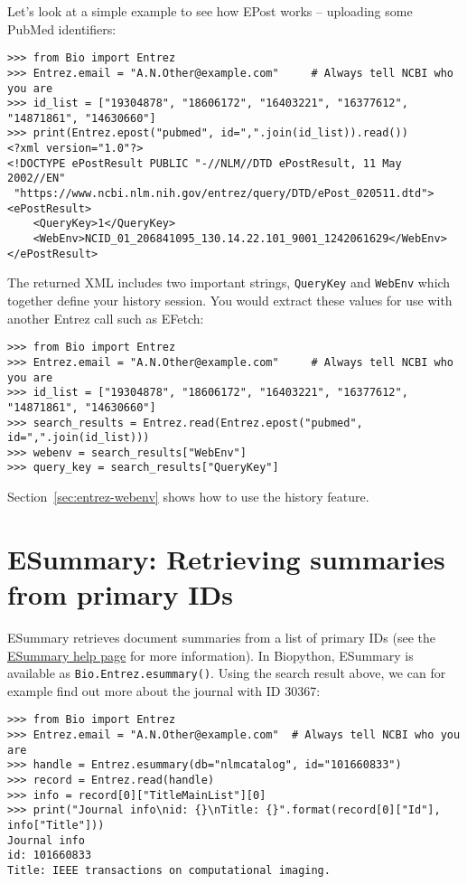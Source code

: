 Let's look at a simple example to see how EPost works -- uploading some PubMed identifiers:
\begin{verbatim}
>>> from Bio import Entrez
>>> Entrez.email = "A.N.Other@example.com"     # Always tell NCBI who you are
>>> id_list = ["19304878", "18606172", "16403221", "16377612", "14871861", "14630660"]
>>> print(Entrez.epost("pubmed", id=",".join(id_list)).read())
<?xml version="1.0"?>
<!DOCTYPE ePostResult PUBLIC "-//NLM//DTD ePostResult, 11 May 2002//EN"
 "https://www.ncbi.nlm.nih.gov/entrez/query/DTD/ePost_020511.dtd">
<ePostResult>
	<QueryKey>1</QueryKey>
	<WebEnv>NCID_01_206841095_130.14.22.101_9001_1242061629</WebEnv>
</ePostResult>
\end{verbatim}
\noindent The returned XML includes two important strings, \verb|QueryKey| and \verb|WebEnv| which together define your history session.
You would extract these values for use with another Entrez call such as EFetch:

\begin{verbatim}
>>> from Bio import Entrez
>>> Entrez.email = "A.N.Other@example.com"     # Always tell NCBI who you are
>>> id_list = ["19304878", "18606172", "16403221", "16377612", "14871861", "14630660"]
>>> search_results = Entrez.read(Entrez.epost("pubmed", id=",".join(id_list)))
>>> webenv = search_results["WebEnv"]
>>> query_key = search_results["QueryKey"]
\end{verbatim}
\noindent Section~\ref{sec:entrez-webenv} shows how to use the history feature.

\section{ESummary: Retrieving summaries from primary IDs}
ESummary retrieves document summaries from a list of primary IDs (see the  \href{https://www.ncbi.nlm.nih.gov/books/NBK25499/#chapter4.ESummary}{ESummary help page} for more information). In Biopython, ESummary is available as \verb+Bio.Entrez.esummary()+. Using the search result above, we can for example find out more about the journal with ID 30367:

\begin{verbatim}
>>> from Bio import Entrez
>>> Entrez.email = "A.N.Other@example.com"  # Always tell NCBI who you are
>>> handle = Entrez.esummary(db="nlmcatalog", id="101660833")
>>> record = Entrez.read(handle)
>>> info = record[0]["TitleMainList"][0]
>>> print("Journal info\nid: {}\nTitle: {}".format(record[0]["Id"], info["Title"]))
Journal info
id: 101660833
Title: IEEE transactions on computational imaging.
\end{verbatim}


